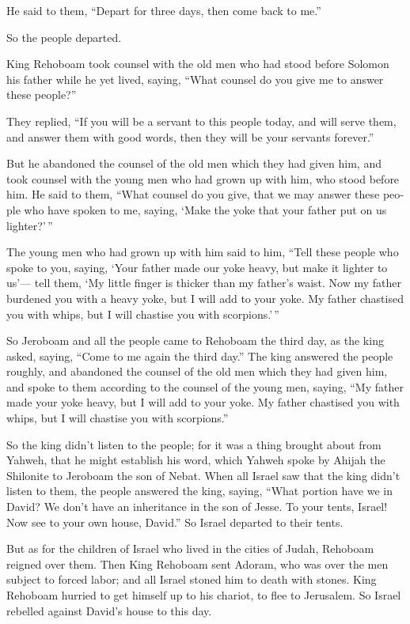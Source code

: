 \begin{paracol}{2}
\begin{otherlanguage}{english}
 He said to them, ``Depart for three days, then come back
to me.''

So the people departed.

 King Rehoboam took counsel with the old men who had stood
before Solomon his father while he yet lived, saying, ``What counsel do
you give me to answer these people?''

 They replied, ``If you will be a servant to this people
today, and will serve them, and answer them with good words, then they
will be your servants forever.''

 But he abandoned the counsel of the old men which they
had given him, and took counsel with the young men who had grown up with
him, who stood before him.  He said to them, ``What
counsel do you give, that we may answer these people who have spoken to
me, saying, `Make the yoke that your father put on us lighter?'\,''

 The young men who had grown up with him said to him,
``Tell these people who spoke to you, saying, `Your father made our yoke
heavy, but make it lighter to us'--- tell them, `My little finger is
thicker than my father's waist.  Now my father burdened
you with a heavy yoke, but I will add to your yoke. My father chastised
you with whips, but I will chastise you with scorpions.'\,''

 So Jeroboam and all the people came to Rehoboam the
third day, as the king asked, saying, ``Come to me again the third
day.''  The king answered the people roughly, and
abandoned the counsel of the old men which they had given him,
 and spoke to them according to the counsel of the young
men, saying, ``My father made your yoke heavy, but I will add to your
yoke. My father chastised you with whips, but I will chastise you with
scorpions.''

 So the king didn't listen to the people; for it was a
thing brought about from Yahweh, that he might establish his word, which
Yahweh spoke by Ahijah the Shilonite to Jeroboam the son of Nebat.
 When all Israel saw that the king didn't listen to them,
the people answered the king, saying, ``What portion have we in David?
We don't have an inheritance in the son of Jesse. To your tents, Israel!
Now see to your own house, David.'' So Israel departed to their tents.

 But as for the children of Israel who lived in the
cities of Judah, Rehoboam reigned over them.  Then King
Rehoboam sent Adoram, who was over the men subject to forced labor; and
all Israel stoned him to death with stones. King Rehoboam hurried to get
himself up to his chariot, to flee to Jerusalem.  So
Israel rebelled against David's house to this day.


\end{otherlanguage}
\end{paracol}
